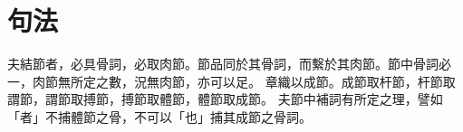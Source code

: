 \chapter*{句法}
夫結節者，必具骨詞，必取肉節。節品同於其骨詞，而繫於其肉節。節中骨詞必一，肉節無所定之數，況無肉節，亦可以足。
章織以成節。成節取杆節，杆節取謂節，謂節取搏節，搏節取體節，體節取成節。
夫節中補詞有所定之理，譬如「者」不捕體節之骨，不可以「也」捕其成節之骨詞。
